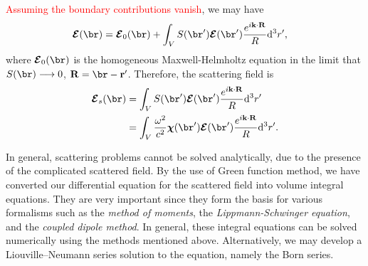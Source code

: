 \documentclass[]{report}
\begin{document}
\textcolor{red}{Assuming the boundary contributions vanish}, we may have
\begin{align}
\boldsymbol{\mathcal{E}}(\br) &= \boldsymbol{\mathcal{E}}_0 (\br) + \int_V S(\br') \boldsymbol{\mathcal{E}}(\br') \frac{e^{i\mathbf{k}\cdot \mathbf{R}}}{R} \mathrm{d}^3 r', \label{Etotal0}
\end{align}
where $ \boldsymbol{\mathcal{E}}_0 (\br) $ is the homogeneous Maxwell-Helmholtz equation in the limit that $ S(\br)\longrightarrow 0 $, $ \mathbf{R}=\br-\mathbf{r}' $. Therefore, the scattering field is
\begin{align}
\boldsymbol{\mathcal{E}}_s(\br) &=  \int_V S(\br') \boldsymbol{\mathcal{E}}(\br') \frac{e^{i\mathbf{k}\cdot \mathbf{R}}}{R} \mathrm{d}^3 r'\\
&= \int_V \frac{\omega^2}{c^2} \boldsymbol{\chi}(\br') \boldsymbol{\mathcal{E}}(\br') \frac{e^{i\mathbf{k}\cdot \mathbf{R}}}{R} \mathrm{d}^3 r'.
\end{align}



In general, scattering problems cannot be solved analytically, due to the presence of the complicated scattered field. By the use of Green function method, we have converted our differential equation for the scattered field into volume integral equations. They are very important since they form the basis for various formalisms such as the \textit{method of moments}, the \textit{Lippmann-Schwinger equation}, and the \textit{coupled dipole method}. In general, these integral equations can be solved numerically using the methods mentioned above. Alternatively, we may develop a Liouville–Neumann series solution to the equation, namely the Born series.
\end{document}

